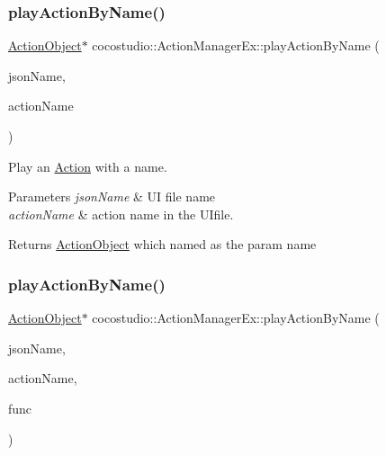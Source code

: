 \subsubsection{\texorpdfstring{play\+Action\+By\+Name()}{playActionByName()}\hspace{0.1cm}{\footnotesize\ttfamily [2/4]}}
{\footnotesize\ttfamily \hyperlink{classcocostudio_1_1ActionObject}{Action\+Object}$\ast$ cocostudio\+::\+Action\+Manager\+Ex\+::play\+Action\+By\+Name (\begin{DoxyParamCaption}\item[{const char $\ast$}]{json\+Name,  }\item[{const char $\ast$}]{action\+Name }\end{DoxyParamCaption})}

Play an \hyperlink{classAction}{Action} with a name.


\begin{DoxyParams}{Parameters}
{\em json\+Name} & UI file name\\
\hline
{\em action\+Name} & action name in the U\+Ifile.\\
\hline
\end{DoxyParams}
\begin{DoxyReturn}{Returns}
\hyperlink{classcocostudio_1_1ActionObject}{Action\+Object} which named as the param name 
\end{DoxyReturn}
\mbox{\label{classcocostudio_1_1ActionManagerEx_a9c8f084cbe82ff09dc1324448fcfffd3}} 
\subsubsection{\texorpdfstring{play\+Action\+By\+Name()}{playActionByName()}\hspace{0.1cm}{\footnotesize\ttfamily [3/4]}}
{\footnotesize\ttfamily \hyperlink{classcocostudio_1_1ActionObject}{Action\+Object}$\ast$ cocostudio\+::\+Action\+Manager\+Ex\+::play\+Action\+By\+Name (\begin{DoxyParamCaption}\item[{const char $\ast$}]{json\+Name,  }\item[{const char $\ast$}]{action\+Name,  }\item[{cocos2d\+::\+Call\+Func $\ast$}]{func }\end{DoxyParamCaption})}

